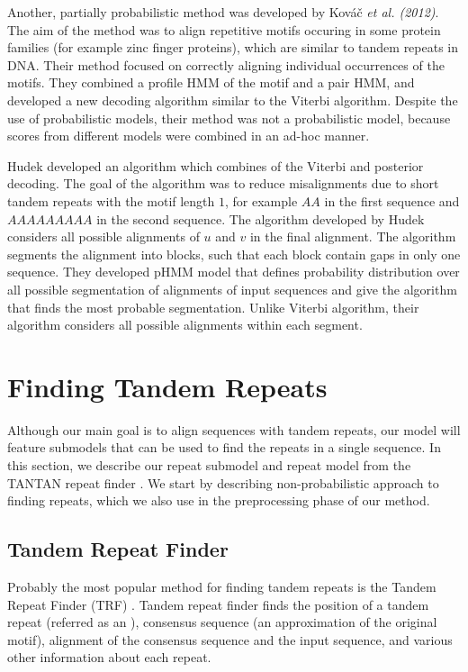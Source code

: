 Another, partially probabilistic method was developed by Kováč {\it et al.
(2012)}\nocite{Kovac2012}. The aim of the method was to align repetitive motifs
occuring in some protein families (for example zinc finger proteins), which are
similar to tandem repeats in DNA. Their method focused on correctly aligning
individual occurrences of the motifs. They combined a profile HMM of the motif
and a pair HMM, and developed a new decoding algorithm similar to the Viterbi
algorithm. Despite the use of probabilistic models, their method was not a
probabilistic model, because scores from different models were combined in an
ad-hoc manner. 

Hudek \cite{Hudek2010} developed an algorithm which combines of the Viterbi and
posterior decoding. The goal of the algorithm was to reduce misalignments due
to short tandem repeats with the motif length $1$, for example $AA$ in the
first sequence and $AAAAAAAAA$ in the second sequence. The algorithm developed
by Hudek considers all possible alignments of $u$ and $v$ in
the final alignment. The algorithm segments the alignment into blocks, such
that each block contain gaps in only one sequence. They developed pHMM model
that defines probability distribution over all possible segmentation of
alignments of input sequences and give the algorithm that finds the most
probable segmentation.  Unlike Viterbi algorithm, their algorithm considers all
possible alignments within each segment.

\section{Finding Tandem Repeats}
Although our main goal is to align sequences with tandem repeats, our model
will feature submodels that can be used to find the repeats in a single
sequence. In this section, we describe our repeat submodel and repeat model
from the TANTAN repeat finder \cite{Frith2011}. We start by describing
non-probabilistic approach to finding repeats, which we also use in the
preprocessing phase of our method.

\subsection{Tandem Repeat Finder}

Probably the most popular method for finding tandem repeats is the Tandem
Repeat Finder (TRF) \cite{Benson1999}.  Tandem repeat finder finds the position
of a tandem repeat (referred as an ), consensus sequence
(an approximation of the original motif), alignment of the consensus sequence
and the input sequence, and various other information about each repeat.

